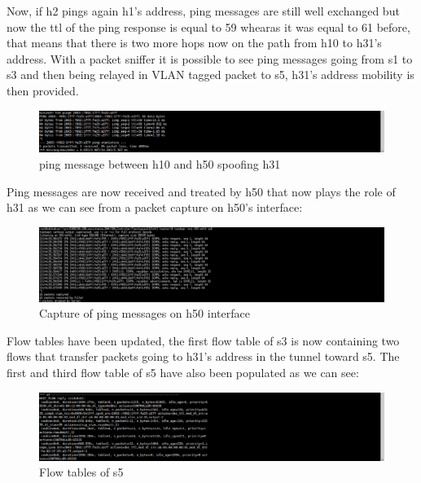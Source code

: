 \documentclass{article}
\begin{document}
Now, if h2 pings again h1's address, ping messages are still well
exchanged but now the ttl of the ping response is equal to 59 whearas
it was equal to 61 before, that means that there is two more hops now
on the path from h10 to h31's address. With a packet sniffer it is
possible to see ping messages going from s1 to s3 and then being
relayed in VLAN tagged packet to s5, h31's address mobility is then
provided.

\begin{figure}[h!]
  \centering
    \includegraphics[trim = 0mm 0mm 237mm 0mm,clip,scale=0.5]{reportPictures/h10_ping_h31spoofed.png}
  \caption{ping message between h10 and h50 spoofing h31}
\end{figure}


Ping messages are now received and treated by h50 that now plays the
role of h31 as we can see from a packet capture on h50's interface:

\begin{figure}[h!]
  \centering
    \includegraphics[trim = 0mm 0mm 237mm 0mm,clip,scale=0.5]{reportPictures/h50_tcpdump.png}
  \caption{Capture of ping messages on h50 interface}
\end{figure}

Flow tables have been updated, the first flow table of s3 is now
containing two flows that transfer packets going to h31's address in
the tunnel toward s5. The first and third flow table of s5 have
also been populated as we can see:

\begin{figure}[h!]
  \centering
    \includegraphics[trim = 0mm 0mm 237mm 0mm,clip,scale=0.5]{reportPictures/s5_dumpflows.png}
  \caption{Flow tables of s5}
\end{figure}
\end{document}
